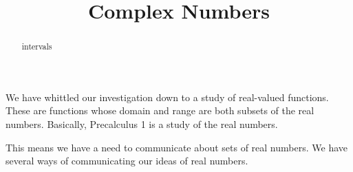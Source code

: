 \documentclass{ximera}
\title{Complex Numbers}
\begin{document}
\begin{abstract}
intervals
\end{abstract}
\maketitle




We have whittled our investigation down to a study of real-valued functions.  These are functions whose domain and range are both subsets of the real numbers.  Basically, Precalculus 1 is a study of the real numbers.

This means we have a need to communicate about sets of real numbers.  We have several ways of communicating our ideas of real numbers.
\end{document}
